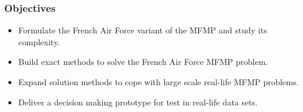 %      



%       


\begin{frame}
\frametitle{\textbf{Objectives}}
  \begin{itemize}[<+->]
  \item 
    Formulate the French Air Force variant of the MFMP and study its complexity.
  \item
    Build exact methods to solve the French Air Force MFMP problem.
  \item
    Expand solution methods to cope with large scale real-life MFMP problems.
  \item
    Deliver a decision making prototype for test in real-life data sets.
  \end{itemize}
\end{frame}
 

  
